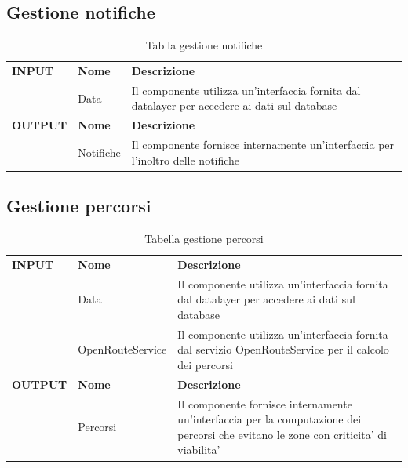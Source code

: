 \documentclass{article}
\begin{document}
\subsection{Gestione notifiche}

\begin{table}[htbp]
    \centering
    \begin{tabularx}{\textwidth}{| l | l | X |}
        \Xhline{2pt}
        \textbf{INPUT} & \textbf{Nome} & \textbf{Descrizione} \\
        \Xhline{2pt}
         & Data & Il componente utilizza un'interfaccia fornita dal datalayer per accedere ai dati sul database \\
        \Xhline{2pt}
        \textbf{OUTPUT} & \textbf{Nome} & \textbf{Descrizione} \\
        \Xhline{2pt}
         & Notifiche & Il componente fornisce internamente un'interfaccia per l'inoltro delle notifiche \\
        \hline
    \end{tabularx}
    \caption{Tablla gestione notifiche}
\end{table}

\clearpage

\subsection{Gestione percorsi}

\begin{table}[htbp]
    \centering
    \begin{tabularx}{\textwidth}{| l | l | X |}
        \Xhline{2pt}
        \textbf{INPUT} & \textbf{Nome} & \textbf{Descrizione} \\
        \Xhline{2pt}
         & Data & Il componente utilizza un'interfaccia fornita dal datalayer per accedere ai dati sul database  \\
        \hline
         & OpenRouteService & Il componente utilizza un'interfaccia fornita dal servizio OpenRouteService per il calcolo dei percorsi \\
         \Xhline{2pt}
        \textbf{OUTPUT} & \textbf{Nome} & \textbf{Descrizione} \\
        \Xhline{2pt}
         & Percorsi & Il componente fornisce internamente un'interfaccia per la computazione dei percorsi che evitano le zone con criticita' di viabilita' \\
        \hline
    \end{tabularx}
    \caption{Tabella gestione percorsi}
\end{table}
\end{document}
